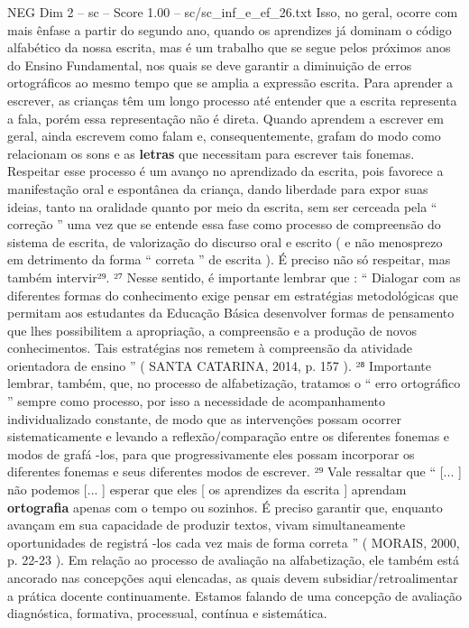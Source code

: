 \begin{textsample}{NEG Dim 2 – sc – Score 1.00 – sc/sc\_inf\_e\_ef\_26.txt}
Isso, no geral, ocorre com mais ênfase a partir do segundo ano, quando os aprendizes já dominam o código alfabético da nossa escrita, mas é um trabalho que se segue pelos próximos anos do Ensino Fundamental, nos quais se deve garantir a diminuição de erros ortográficos ao mesmo tempo que se amplia a expressão escrita.
Para aprender a escrever, as crianças têm um longo processo até entender que a escrita representa a fala, porém essa representação não é direta.
Quando aprendem a escrever em geral, ainda escrevem como falam e, consequentemente, grafam do modo como relacionam os sons e as \textbf{letras} que necessitam para escrever tais fonemas.
Respeitar esse processo é um avanço no aprendizado da escrita, pois favorece a manifestação oral e espontânea da criança, dando liberdade para expor suas ideias, tanto na oralidade quanto por meio da escrita, sem ser cerceada pela “ correção ” uma vez que se entende essa fase como processo de compreensão do sistema de escrita, de valorização do discurso oral e escrito ( e não menosprezo em detrimento da forma “ correta ” de escrita ).
É preciso não só respeitar, mas também intervir²⁹. ²⁷ Nesse sentido, é importante lembrar que : “ Dialogar com as diferentes formas do conhecimento exige pensar em estratégias metodológicas que permitam aos estudantes da Educação Básica desenvolver formas de pensamento que lhes possibilitem a apropriação, a compreensão e a produção de novos conhecimentos.
Tais estratégias nos remetem à compreensão da atividade orientadora de ensino ” ( SANTA CATARINA, 2014, p. 157 ). ²⁸ Importante lembrar, também, que, no processo de alfabetização, tratamos o “ erro ortográfico ” sempre como processo, por isso a necessidade de acompanhamento individualizado constante, de modo que as intervenções possam ocorrer sistematicamente e levando a reflexão/comparação entre os diferentes fonemas e modos de grafá -los, para que progressivamente eles possam incorporar os diferentes fonemas e seus diferentes modos de escrever. ²⁹ Vale ressaltar que “ [... ] não podemos [... ] esperar que eles [ os aprendizes da escrita ] aprendam \textbf{ortografia} apenas com o tempo ou sozinhos.
É preciso garantir que, enquanto avançam em sua capacidade de produzir textos, vivam simultaneamente oportunidades de registrá -los cada vez mais de forma correta ” ( MORAIS, 2000, p. 22-23 ).
Em relação ao processo de avaliação na alfabetização, ele também está ancorado nas concepções aqui elencadas, as quais devem subsidiar/retroalimentar a prática docente continuamente.
Estamos falando de uma concepção de avaliação diagnóstica, formativa, processual, contínua e sistemática.

\end{textsample}
